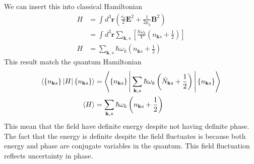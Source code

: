 \documentclass[../../../main.tex]{subfiles}
\begin{document}
\begin{equation*}
\end{equation*}
We can insert this into classical Hamiltonian
\begin{align*}
  H & =   \int d^3 \mathbf{r}  \left( \frac{\epsilon_0}{2} \mathbf{E}^2 + \frac{1}{2\mu_0} \mathbf{B}^2 \right)        \\
    & = \int d^3 \mathbf{r } \sum_{\mathbf{k},s} \left[ \frac{\hbar  \omega_k }{V }\left( n_{\mathbf{k }s}+\frac{1 }{2 } \right)  \right] \\
  H & = \sum_{\mathbf{k},s} \hbar \omega_k \left( n_{\mathbf{k }s}+\frac{1 }{2} \right)
\end{align*}
This result match the quantum Hamiltonian
\begin{align*}
  \braket{\left\{ n_{\mathbf{k }s} \right\} |H|\left\{ n_{\mathbf{k }s} \right\} }
   & =
  \left\langle \left\{ n_{\mathbf{k }s} \right\} \Bigg| \sum_{\mathbf{k},s} \hbar \omega_k \left( \hat{N }_{\mathbf{k} s }+ \frac{1 }{2} \right)\Bigg|\left\{ n_{\mathbf{k }s} \right\}  \right\rangle \\
  \braket{H}
   & =  \sum_{\mathbf{k},s} \hbar \omega_k \left( n_{\mathbf{k }s} +\frac{1 }{2} \right)
\end{align*}
\begin{equation*}
\end{equation*}
This mean that the field have definite energy despite not having definite phase.
The fact that the energy is definite despite the field fluctuates is because both energy and phase are conjugate variables in the quantum.
This field fluctuation reflects uncertainty in phase.
\end{document}
